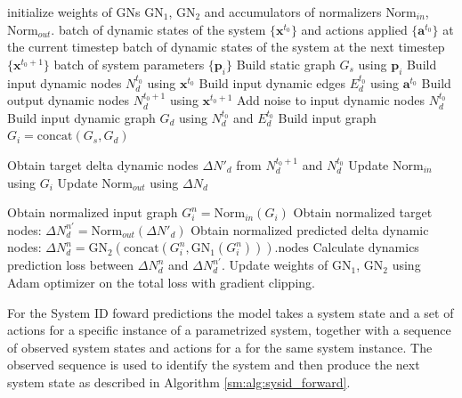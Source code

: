 \begin{algorithm}[t]
   \caption{One step of the training algorithm}
   \label{sm:alg:training_one_step}
\begin{algorithmic}
     initialize weights of GNs $\textrm{GN}_1$, $\textrm{GN}_2$ and accumulators of normalizers $\textrm{Norm}_{in}$, $\textrm{Norm}_{out}$.
    batch of dynamic states of the system $\{\textbf{x}^{t_0}\}$ and actions applied $\{\textbf{a}^{t_0}\}$ at the current timestep
    batch of dynamic states of the system at the next timestep $\{\textbf{x}^{t_0+1}\}$ 
    batch of system parameters  $\{\textbf{p}_i\}$
   \STATE Build static graph $G_s$ using $\textbf{p}_i$
   \STATE Build input dynamic nodes $N^{t_0}_d$ using $\textbf{x}^{t_0}$
   \STATE Build input dynamic edges $E^{t_0}_d$ using $\textbf{a}^{t_0}$
   \STATE Build output dynamic nodes $N^{t_0+1}_d$ using $\textbf{x}^{t_0+1}$
   \STATE Add noise to input dynamic nodes $N^{t_0}_d$
   \STATE Build input dynamic graph $G_d$ using $N^{t_0}_d$ and $E^{t_0}_d$
   \STATE Build input graph $G_i = \textrm{concat}(G_s, G_d)$
   
   \STATE Obtain target delta dynamic nodes $\Delta N{'}_{d}$ from $N^{t_0+1}_d$ and $N^{t_0}_d$
   \STATE Update $\textrm{Norm}_{in}$ using $G_i$
   \STATE Update $\textrm{Norm}_{out}$ using ${\Delta}N_{d}$
   
   \STATE Obtain normalized input graph $G^n_i = \textrm{Norm}_{in}(G_i)$
   \STATE Obtain normalized target nodes:
   ${\Delta}N^{n'}_d= \textrm{Norm}_{out}({\Delta}N{'}_{d})$
   \STATE Obtain normalized predicted delta dynamic nodes:
   ${\Delta}N^{n}_d= \textrm{GN}_2(\textrm{concat}(G^n_i, \textrm{GN}_1(G^n_i)))\textrm{.nodes}$  
   \STATE Calculate dynamics prediction loss between ${\Delta}N^{n}_d$ and ${\Delta}N^{n'}_d$.
   \ENDFOR
   \STATE Update weights of $\textrm{GN}_1$, $\textrm{GN}_2$ using Adam optimizer on the total loss with gradient clipping.
\end{algorithmic}
\end{algorithm}

For the System ID foward predictions the model takes a system state and a set of actions for a specific instance of a parametrized system, together with a sequence of observed system states and actions for a for the same system instance. The observed sequence is used to identify the system and then produce the next system state as described in Algorithm \ref{sm:alg:sysid_forward}.


